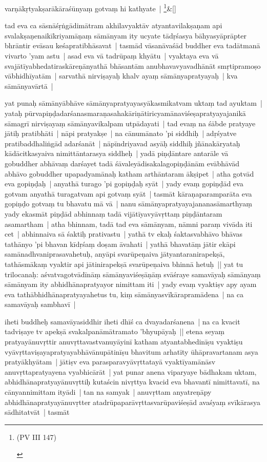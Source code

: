 \documentclass[article,12pt,a4paper]{memoir}
\newcommand{\persName}[1]{#1}
\begin{document}
	    
	    \stanza[\smallbreak]
	varṇākṛtyakṣarākāraśūnyaṃ gotvaṃ hi kathyate | \footnote{\begin{english}(PV III 147)\end{english}}\&[\smallbreak]


	

	  \pstart tad eva ca sāsnāśṛṅgādimātram akhilavyaktāv atyantavilakṣaṇam api svalakṣaṇenaikīkriyamāṇaṃ sāmānyam ity ucyate tādṛśasya bāhyasyāprāpter bhrāntir evāsau keśapratibhāsavat | tasmād vāsanāvaśād buddher eva tadātmanā vivarto 'yam astu | asad eva vā tadrūpaṃ khyātu | vyaktaya eva vā svajātīyabhedatiraskāreṇānyathā bhāsantām anubhavavyavadhānāt smṛtipramoṣo vābhidhīyatām | sarvathā nirviṣayaḥ khalv ayaṃ sāmānyapratyayaḥ | kva sāmānyavārtā | 
	\pend
      

	  \pstart yat punaḥ sāmānyābhāve sāmānyapratyayasyākasmikatvam uktaṃ tad ayuktam | yataḥ pūrvapiṇḍadarśanasmaraṇasahakāriṇātiricyamānaviśeṣapratyayajanikā sāmagrī nirviṣayaṃ sāmānyavikalpam utpādayati | tad evaṃ na śābde pratyaye jātiḥ pratibhāti | nāpi pratyakṣe | na cānumānato 'pi siddhiḥ | adṛśyatve pratibaddhaliṅgād adarśanāt | nāpīndriyavad asyāḥ siddhiḥ jñānakāryataḥ kādācitkasyaiva nimittāntarasya siddheḥ | yadā piṇḍāntare antarāle vā gobuddher abhāvaṃ darśayet tadā śāvaleyādisakalagopiṇḍānām evābhāvād abhāvo gobuddher upapadyamānaḥ katham arthāntaram ākṣipet | atha gotvād eva gopiṇḍaḥ | anyathā turago 'pi gopiṇḍaḥ syāt | yady evaṃ gopiṇḍād eva gotvam anyathā turagatvam api gotvaṃ syāt | tasmāt kāraṇaparamparāta eva gopiṇḍo gotvaṃ tu bhavatu mā vā | nanu sāmānyapratyayajananasāmarthyaṃ yady ekasmāt piṇḍād abhinnaṃ tadā vijātīyavyāvṛttaṃ piṇḍāntaram asamartham | atha bhinnam, tadā tad eva sāmānyam, nāmni paraṃ vivāda iti cet | abhinnaiva sā śaktiḥ prativastu | yathā tv ekaḥ śaktasvabhāvo bhāvas tathānyo 'pi bhavan kīdṛśaṃ doṣam āvahati | yathā bhavatāṃ jātir ekāpi samānadhvaniprasavahetuḥ, anyāpi svarūpeṇaiva jātyantaranirapekṣā, tathāsmākaṃ vyaktir api jātinirapekṣā svarūpeṇaiva bhinnā hetuḥ || \label{thakur75-64.7} yat tu \persName{trilocanaḥ}: aśvatvagotvādīnāṃ sāmānyaviśeṣāṇāṃ svāśraye samavāyaḥ sāmānyaṃ sāmānyam ity abhidhānapratyayor nimittam iti | yady evaṃ vyaktiṣv apy ayam eva tathābhidhānapratyayahetus tu, kiṃ sāmānyasvīkārapramādena | na ca samavāyaḥ sambhavī |
	\pend
      

	  \pstart iheti buddheḥ samavāyasiddhir iheti dhīś ca dvayadarśanena | na ca kvacit tadviṣaye tv apekṣā svakalpanāmātramato 'bhyupāyaḥ || \label{thakur75-64.15} etena seyaṃ pratyayānuvṛttir anuvṛttavastvanuyāyinī katham atyantabhedinīṣu vyaktiṣu vyāvṛttaviṣayapratyayabhāvānupātinīṣu bhavitum arhatīty ūhāpravartanam asya pratyākhyātam | jātiṣv eva parasparavyāvṛttatayā vyaktīyamānāsv anuvṛttapratyayena vyabhicārāt | \label{thakur75-64.19} yat punar anena viparyaye bādhakam uktam, abhidhānapratyayānuvṛttiḥ kutaścin nivṛttya kvacid eva bhavantī nimittavatī, na cānyannimittam ityādi | tan na samyak | anuvṛttam anyatreṇāpy abhidhānapratyayānuvṛtter atadrūpaparāvṛttasvarūpaviśeṣād avaśyaṃ svīkārasya sādhitatvāt | tasmāt
	\pend
      
\end{document}
